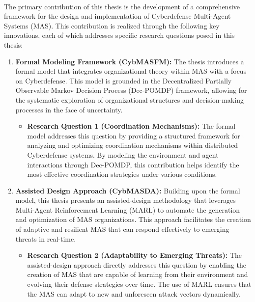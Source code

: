 \

The primary contribution of this thesis is the development of a comprehensive framework for the design and implementation of Cyberdefense Multi-Agent Systems (MAS). This contribution is realized through the following key innovations, each of which addresses specific research questions posed in this thesis:

\begin{enumerate}
    \item \textbf{Formal Modeling Framework (CybMASFM):} The thesis introduces a formal model that integrates organizational theory within MAS with a focus on Cyberdefense. This model is grounded in the Decentralized Partially Observable Markov Decision Process (Dec-POMDP) framework, allowing for the systematic exploration of organizational structures and decision-making processes in the face of uncertainty.

          \begin{itemize}
              \item \textbf{Research Question 1 (Coordination Mechanisms):} The formal model addresses this question by providing a structured framework for analyzing and optimizing coordination mechanisms within distributed Cyberdefense systems. By modeling the environment and agent interactions through Dec-POMDP, this contribution helps identify the most effective coordination strategies under various conditions.
          \end{itemize}

    \item \textbf{Assisted Design Approach (CybMASDA):} Building upon the formal model, this thesis presents an assisted-design methodology that leverages Multi-Agent Reinforcement Learning (MARL) to automate the generation and optimization of MAS organizations. This approach facilitates the creation of adaptive and resilient MAS that can respond effectively to emerging threats in real-time.

          \begin{itemize}
              \item \textbf{Research Question 2 (Adaptability to Emerging Threats):} The assisted-design approach directly addresses this question by enabling the creation of MAS that are capable of learning from their environment and evolving their defense strategies over time. The use of MARL ensures that the MAS can adapt to new and unforeseen attack vectors dynamically.
          \end{itemize}


\end{enumerate}
